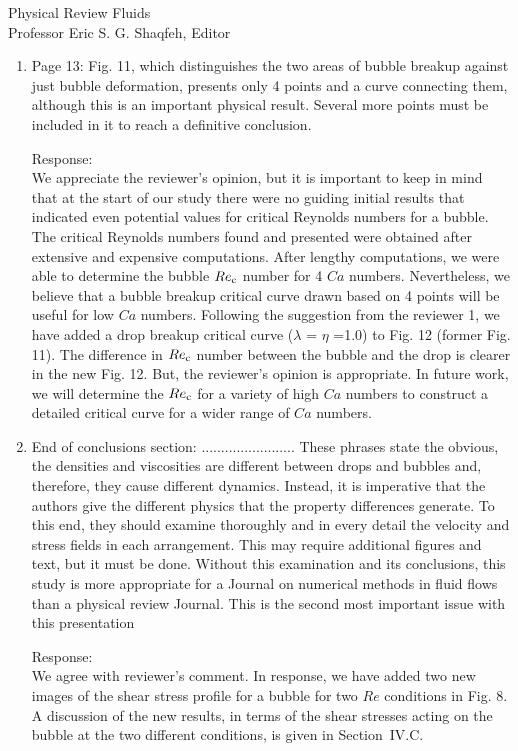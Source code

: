 \documentclass{letter}
\begin{document}
\begin{letter}{
Physical Review Fluids\\
Professor Eric S. G. Shaqfeh, Editor\\}
\begin{enumerate}
\par\noindent
\item
\textsf
{ Page 13: Fig. 11, which distinguishes the two areas of bubble breakup against
just bubble deformation, presents only 4 points and a curve connecting them,
although this is an important physical result. Several more points must be
included in it to reach a definitive conclusion.}
\vspace{3 mm}

Response: \\
We appreciate the reviewer's opinion, but it is important to keep in mind that
at the start of our study there were no guiding initial results that indicated
even potential values for critical Reynolds numbers for a bubble. The critical
Reynolds numbers found and presented were obtained after extensive and
expensive computations.  After lengthy computations, we were able to determine
the bubble $Re_{\rm c}$ number for 4 $Ca$ numbers.  Nevertheless, we believe
that a bubble breakup critical curve drawn based on 4 points will be useful for
low $Ca$ numbers.  Following the suggestion from the reviewer 1, we have added
a drop breakup critical curve ($\lambda$ = $\eta$ =1.0) to Fig. 12 (former Fig. 11).  
The difference in $Re_{\rm c}$ number between the bubble and the drop is clearer in
the new Fig. 12.  But, the reviewer's opinion is appropriate. 
In future work, we will determine the $Re_{\rm c}$ for a variety of high $Ca$ numbers 
to construct a detailed critical curve for a wider range of $Ca$ numbers.\\


\par\noindent
\item
\textsf
{\color{red}  End of conclusions section: ........................
These phrases state the obvious, the densities and viscosities are different between drops and bubbles and, therefore, they cause different dynamics. 
Instead, it is imperative that the authors give the different physics that the property differences generate. 
To this end, they should examine thoroughly and in every detail the velocity and stress fields in each arrangement. 
This may require additional figures and text, but it must be done. Without this examination and its conclusions, this study is more appropriate for a 
Journal on numerical methods in fluid flows than a physical review Journal. This is the second most important issue with this presentation}
\vspace{3 mm}

Response: \\
{\color{red}
We agree with reviewer's comment. In response, we have added two new images of the
shear stress profile for a bubble for two $Re$ conditions in Fig. 8.
A discussion of the new results, in terms of the shear stresses acting on the
bubble at the two different conditions, is given in Section~I\hspace{-1.2pt}V.C. 
}
\\



\end{enumerate}
\end{letter}
\end{document}
